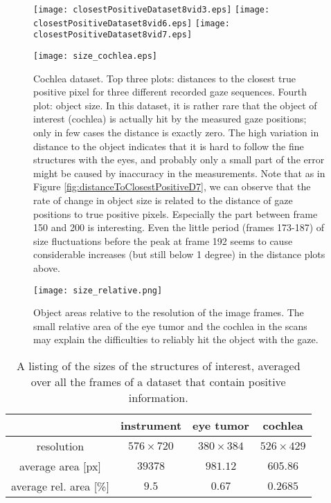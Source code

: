 \begin{figure}[ht]
	  \texttt{[image: closestPositiveDataset8vid3.eps]}
	  \texttt{[image: closestPositiveDataset8vid6.eps]}
	  \texttt{[image: closestPositiveDataset8vid7.eps]}
	  
	  \vspace{3mm}
	  \texttt{[image: size\_cochlea.eps]}	  
	  \caption{Cochlea dataset. Top three plots: distances to the closest true positive pixel for three different recorded gaze sequences. Fourth plot: object size. In this dataset, it is rather rare that the object of interest (cochlea) is actually hit by the measured gaze positions; only in few cases the distance is exactly zero. The high variation in distance to the object indicates that it is hard to follow the fine structures with the eyes, and probably only a small part of the error might be caused by inaccuracy in the measurements. Note that as in Figure \ref{fig:distanceToClosestPositiveD7}, we can observe that the rate of change in object size is related to the distance of gaze positions to true positive pixels. Especially the part between frame 150 and 200 is interesting. Even the little period (frames 173-187) of size fluctuations before the peak at frame 192 seems to cause considerable increases (but still below 1 degree) in the distance plots above.}
	\label{fig:distanceToClosestPositiveD8}
\end{figure}

\begin{figure}[ht]
	\centering
	  \texttt{[image: size\_relative.png]}
	\caption{Object areas relative to the resolution of the image frames. The small relative area of the eye tumor and the cochlea in the scans may explain the difficulties to reliably hit the object with the gaze.}
	\label{fig:relativeobjectsize}
\end{figure}

\begin{table}[ht]
	\centering
	  \caption{A listing of the sizes of the structures of interest, averaged over all the frames of a dataset that contain positive information.}
	  \label{tab:avgobjectsize}
	\begin{tabular}{ | c  c  c  c | }
	\hline
				& instrument 	& eye tumor & cochlea \\ \hline
	  resolution  		& $576 \times 720$ & $380 \times 384$ & $526 \times 429$ \\ 
	  average area [px]	& $39378$ 	& $981.12$ 	 & $605.86$ \\
	  average rel. area [\%]& $9.5$ 		& $0.67$ 		 & $0.2685$ \\ \hline
	\end{tabular}
\end{table}

